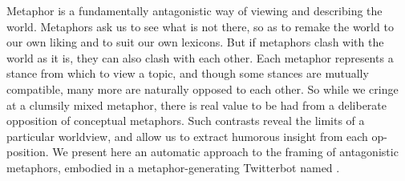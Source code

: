 Metaphor is a fundamentally antagonistic way of viewing and describing the world. Metaphors ask us to see what is not there, so as to remake the world to our own liking and to suit our own lexicons. But if metaphors clash with the world as it is, they can also clash with each other. Each metaphor represents a stance from which to view a topic, and though some stances are mutually compatible, many more are naturally opposed to each other. So while we cringe at a clumsily mixed metaphor, there is real value to be had from a deliberate opposition of conceptual metaphors. Such contrasts reveal the limits of a particular worldview, and allow us to extract humorous insight from each op-position. We present here an automatic approach to the framing of antagonistic metaphors, embodied in a metaphor-generating Twitterbot named \@MetaphorMagnet.
